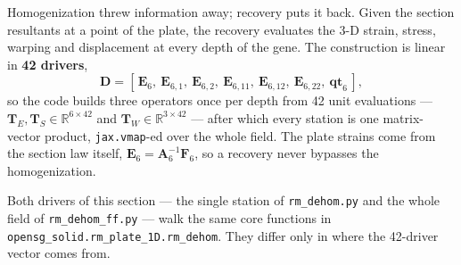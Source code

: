 Homogenization threw information away; recovery puts it back. Given the section
resultants at a point of the plate, the recovery evaluates the 3-D strain,
stress, warping and displacement at every depth of the gene. The construction is
linear in \textbf{42 drivers},
%
\begin{equation}
\mathbf{D} = [\,\mathbf{E}_6,\ \mathbf{E}_{6,1},\ \mathbf{E}_{6,2},\
 \mathbf{E}_{6,11},\ \mathbf{E}_{6,12},\ \mathbf{E}_{6,22},\ \mathbf{qt}_6\,],
\label{eq:solid-42}
\end{equation}
%
so the code builds three operators once per depth from 42 unit evaluations ---
$\mathbf{T}_E,\mathbf{T}_S \in \mathbb{R}^{6\times42}$ and
$\mathbf{T}_W \in \mathbb{R}^{3\times42}$ --- after which every station is one
matrix-vector product, \texttt{jax.vmap}-ed over the whole field. The plate
strains come from the section law itself,
$\mathbf{E}_6 = \mathbf{A}_6^{-1}\mathbf{F}_6$, so a recovery never bypasses the
homogenization.

Both drivers of this section --- the single station of \texttt{rm\_dehom.py} and
the whole field of \texttt{rm\_dehom\_ff.py} --- walk the same core functions in
\texttt{opensg\_solid.rm\_plate\_1D.rm\_dehom}. They differ only in where the
42-driver vector comes from.

